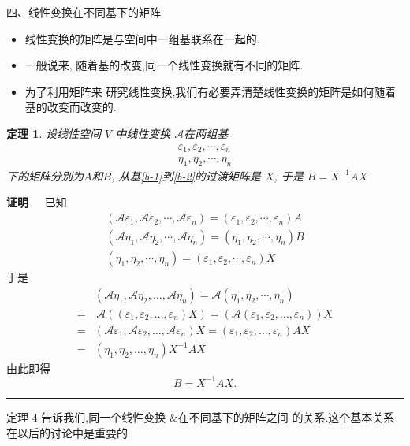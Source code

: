 \documentclass[13pt]{beamer}
\newtheorem{thm}{定理}
\def\qed{\nopagebreak\hfill{\rule{4pt}{7pt}}\medbreak}
\def\pf{{\bf 证明~~ }}
\def\A{\mathscr{A}}
\begin{document}
\begin{frame}{四、线性变换在不同基下的矩阵}
\begin{itemize}
	\item 线性变换的矩阵是与空间中一组基联系在一起的.
	\item 一般说来,  随着基的改变,同一个线性变换就有不同的矩阵.
	\item 为了利用矩阵来 研究线性变换,我们有必要弄清楚线性变换的矩阵是如何随着基的改变而改变的. 
\end{itemize}

\begin{thm}
设线性空间 $V$ 中线性变换 $\A$在两组基
\begin{align}
	{\varepsilon}_{1}, {\varepsilon}_{2}, \cdots, {\varepsilon}_{n}  \label{b-1} \tag{I}\\
	{\eta}_{1}, {\eta}_{2}, \cdots, {\eta}_{n} \label{b-2} \tag{II}
\end{align}
下的矩阵分别为$A$和$B$, 从基\eqref{b-1}到\eqref{b-2}的过渡矩阵是 $X$, 于是 ${B}={X}^{-1} {A X}$
\end{thm}
\end{frame}

\begin{frame}
\pf 已知
\[
\begin{array}{c}
\left(\mathscr{A} {\varepsilon}_{1}, \A {\varepsilon}_{2}, \cdots, \mathscr{A} {\varepsilon}_{n}\right)=\left({\varepsilon}_{1}, {\varepsilon}_{2}, \cdots, {\varepsilon}_{n}\right) {A} \\
\left(\A{\eta}_{1}, \A {\eta}_{2}, \cdots, \A {\eta}_{n}\right)=\left({\eta}_{1}, {\eta}_{2}, \cdots, {\eta}_{n}\right) {B} \\
\left({\eta}_{1}, {\eta}_{2}, \cdots, {\eta}_{n}\right)=\left({\varepsilon}_{1}, {\varepsilon}_{2}, \cdots, {\varepsilon}_{n}\right) {X}
\end{array}
\]
于是
$$
\begin{aligned} 
& \left( \mathscr{A} \eta_{1}, \mathscr{A} \eta_{2}, \ldots, \mathscr{A} \eta_{n}\right)
=   \mathscr{A} \left({\eta}_{1}, {\eta}_{2}, \cdots, {\eta}_{n}\right)  \\
= & \, \A\left(\left( \varepsilon_{1}, \varepsilon_{2}, \ldots, \varepsilon_{n}\right) X \right) 
=    \left( \A \left(\varepsilon_{1}, \varepsilon_{2}, \ldots, \varepsilon_{n}\right)\right) X \\
=  &  \left( \A \varepsilon_{1}, \A \varepsilon_{2}, \ldots, \A \varepsilon_{n}\right) X
=   \left(\varepsilon_{1}, \varepsilon_{2}, \ldots, \varepsilon_{n}\right) A X \\
= &     \left(\eta_{1}, \eta_{2}, \ldots, \eta_{n}\right) X^{-1} A X \end{aligned}
 $$
由此即得
\[
{B}={X}^{-1} {A} {X}.
\]
\qed
定理 4 告诉我们,同一个线性变换 \&在不同基下的矩阵之间 的关系.这个基本关系在以后的讨论中是重要的.


\end{frame}
 
\end{document}
